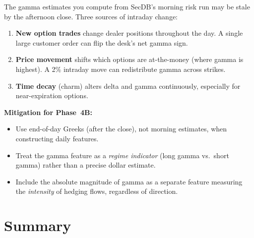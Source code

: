 \begin{warning}
The gamma estimates you compute from SecDB's morning risk run may be
stale by the afternoon close.  Three sources of intraday change:
\begin{enumerate}[nosep]
  \item \textbf{New option trades} change dealer positions throughout
        the day.  A single large customer order can flip the desk's
        net gamma sign.
  \item \textbf{Price movement} shifts which options are at-the-money
        (where gamma is highest).  A 2\% intraday move can
        redistribute gamma across strikes.
  \item \textbf{Time decay} (charm) alters delta and gamma
        continuously, especially for near-expiration options.
\end{enumerate}

\textbf{Mitigation for Phase~4B:}
\begin{itemize}[nosep]
  \item Use end-of-day Greeks (after the close), not morning
        estimates, when constructing daily features.
  \item Treat the gamma feature as a \emph{regime indicator}
        (long gamma vs.\ short gamma) rather than a precise dollar
        estimate.
  \item Include the absolute magnitude of gamma as a separate feature
        measuring the \emph{intensity} of hedging flows, regardless
        of direction.
\end{itemize}
\end{warning}


\section{Summary}
\label{sec:micro-summary}

